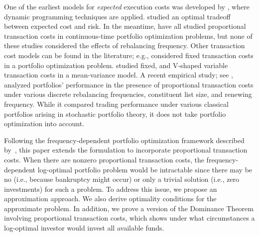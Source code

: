 \documentclass[10pt]{article} %
\begin{document}
	One of the earliest models for \textit{expected} execution costs was developed by \cite{bertsimas1998optimal}, where dynamic programming techniques are applied. 
	\cite{almgren2001optimal} studied an optimal tradeoff between expected cost and risk.
	In the meantime, \cite{Magill1976, shreve1994optimal, muthuraman2006multidimensional} have all studied proportional transaction costs in continuous-time portfolio optimization problems, but none of these studies considered the effects of rebalancing frequency. 
	Other transaction cost models can be found in the literature; e.g., \cite{lobo2007portfolio} considered fixed transaction costs in a portfolio optimization problem. %
	\cite{woodside2013portfolio} studied fixed, and V-shaped variable transaction costs in a mean-variance model.
	A recent empirical study; see \cite{ruf2020impact}, analyzed portfolios' performance in the presence of proportional transaction costs under various discrete rebalancing frequencies, constituent list size, and renewing frequency. 
	While it compared trading performance under various classical portfolios arising in stochastic portfolio theory, it does not take portfolio optimization into account.
	
	
	Following the frequency-dependent portfolio optimization framework described by~\cite{hsieh2018rebalancing, hsieh2021necessary}, this paper extends the formulation to incorporate proportional transaction costs.
	When there are nonzero proportional transaction costs, the frequency-dependent log-optimal portfolio problem would be intractable since there may be no  (i.e., because bankruptcy might occur) or only a trivial solution (i.e., zero investments) for such a problem. 
	To address this issue,   we propose an approximation approach. 
	We also derive optimality conditions for the approximate problem.
	In addition, we prove a version of the Dominance Theorem involving proportional transaction costs, which shows under what circumstances a log-optimal investor would invest all available funds.
	
	
	
	
\end{document}
